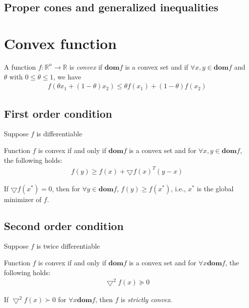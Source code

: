 \subsection{Proper cones and generalized inequalities}



\section{Convex function}
\begin{definition}
    A function $f:\mathbb{R}^n \rightarrow \mathbb{R}$
    is \emph{convex} if $\mathbf{dom}f$ is a convex
    set and if $\forall x, y \in \mathbf{dom}f$ and
    $\theta$ with $0 \leq \theta\leq 1$, we have
    \begin{align}
        f(\theta x_1 + (1 - \theta) x_2) \leq
        \theta f(x_1) + (1 - \theta) f(x_2)
    \end{align}
\end{definition}

\subsection{First order condition}
Suppose $f$ is differentiable
\begin{theorem}
    Function $f$ is convex if and only if $\mathbf{dom}f$
    is a convex set and for $\forall x, y \in \mathbf{dom}f$,
    the following holds:
    \begin{align}
        f(y) \geq f(x) + \bigtriangledown f(x)^T (y - x)
    \end{align}
    \label{th:conv2}
\end{theorem}

\begin{remark}
    If $\bigtriangledown f(x^*) = 0$, then for
    $\forall y \in \mathbf{dom}f$, 
    $f(y) \geq f(x^*)$, i.e., $x^*$
    is the global minimizer of $f$.
\end{remark}

\subsection{Second order condition}
Suppose $f$ is twice differentiable
\begin{theorem}
    Function $f$ is convex if and only if $\mathbf{dom}f$
    is a convex set and for $\forall x \mathbf{dom}f$,
    the following holds:
    \begin{align}
        \bigtriangledown^2 f(x) \succeq 0 
    \end{align}
\end{theorem}
\begin{remark}
    If $\bigtriangledown^2 f(x) \succ 0$ for
    $\forall x \mathbf{dom}f$, then $f$ is
    \emph{strictly convex}.
\end{remark}

